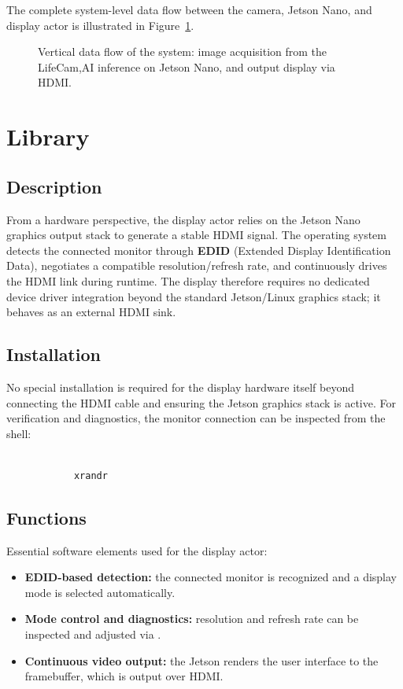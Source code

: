 The complete system-level data flow between the camera, Jetson Nano, and display actor is illustrated in Figure~\ref{fig:dataflow_display}.

\begin{figure}[H]
	\centering
	
	\caption{Vertical data flow of the system: image acquisition from the LifeCam,\ac{AI} inference on Jetson Nano, and output display via \ac{HDMI}.}
	\label{fig:dataflow_display}
\end{figure}

\section{Library}
\subsection{Description}
From a hardware perspective, the display actor relies on the Jetson Nano graphics output stack to generate a stable \ac{HDMI} signal.
The operating system detects the connected monitor through \textbf{EDID} (Extended Display Identification Data), negotiates a compatible resolution/refresh rate, and continuously drives the \ac{HDMI} link during runtime.
The display therefore requires no dedicated device driver integration beyond the standard Jetson/Linux graphics stack; it behaves as an external \ac{HDMI} sink.

\subsection{Installation}
No special installation is required for the display hardware itself beyond connecting the \ac{HDMI} cable and ensuring the Jetson graphics stack is active.
For verification and diagnostics, the monitor connection can be inspected from the shell:

\begin{tcolorbox}[colback=white,colframe=black,coltext= ShellColor, sharp corners, boxrule=0.8pt]
	\begin{small}
		\begin{verbatim}
			
			xrandr	\end{verbatim}
	\end{small}
\end{tcolorbox}

\subsection{Functions}
Essential software elements used for the display actor:
\begin{itemize}
	\item \textbf{EDID-based detection:} the connected monitor is recognized and a display mode is selected automatically.
	\item \textbf{Mode control and diagnostics:} resolution and refresh rate can be inspected and adjusted via .
	\item \textbf{Continuous video output:} the Jetson renders the user interface to the framebuffer, which is output over \ac{HDMI}.
\end{itemize}

